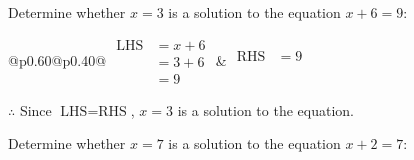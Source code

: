 \documentclass[12pt]{article}
\newcounter{minipagecount}
\begin{document}
\begin{multicols}{2}
\begin{minipage}[t]{0.40\textwidth}
    \noindent Determine whether \(x = 3\) is a solution to the equation \(x + 6 = 9\):
    \vspace{4pt}  %

    \noindent
    \renewcommand{\arraystretch}{1.3} %
    \begin{tabular}{@{}p{0.60\linewidth}@{}p{0.40\linewidth}@{}}
        \(\begin{aligned}
            \text{LHS} &= x + 6 \\
                    &= 3 + 6 \\
                    &= 9 
        \end{aligned}\) &
        \(\begin{aligned}
            \text{RHS} &= 9\\
                    & \\
                    &
        \end{aligned}\)
    \end{tabular}
    \renewcommand{\arraystretch}{1.0} %
    \vspace{2pt}  %

    \noindent \(\therefore\) Since \(\text{LHS} = \text{RHS}\), \(x = 3\) is  a solution to the equation.

\end{minipage}

 \vspace*{16pt}
\newpage
\noindent{(\theminipagecount)}\hspace{0.1mm} %
\begin{minipage}[t]{0.40\textwidth} %

    \noindent Determine whether \(x = 7\) is a solution to the equation \(x + 2 = 7\):
    \vspace{4pt}  %


\end{minipage}
\end{multicols}
\end{document}
